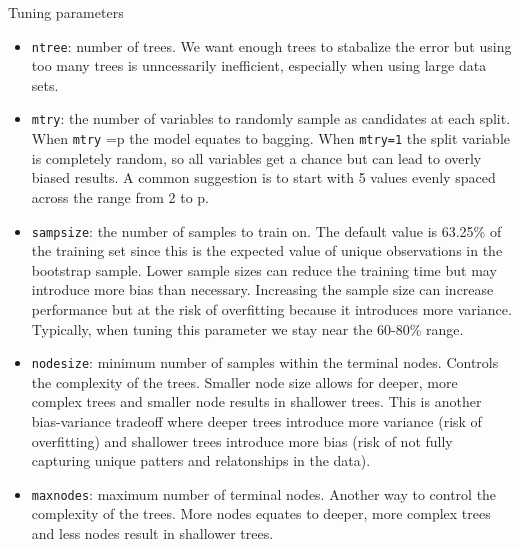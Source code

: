 \documentclass[10pt,ignorenonframetext,]{beamer}
\providecommand{\tightlist}{%
  \setlength{\itemsep}{0pt}\setlength{\parskip}{0pt}}
\begin{document}
\begin{frame}[fragile]{Tuning parameters}

\begin{itemize}
\tightlist
\item
  \texttt{ntree}: number of trees. We want enough trees to stabalize the
  error but using too many trees is unncessarily inefficient, especially
  when using large data sets.
\item
  \texttt{mtry}: the number of variables to randomly sample as
  candidates at each split. When \texttt{mtry} =p the model equates to
  bagging. When \texttt{mtry=1} the split variable is completely random,
  so all variables get a chance but can lead to overly biased results. A
  common suggestion is to start with 5 values evenly spaced across the
  range from 2 to p.
\item
  \texttt{sampsize}: the number of samples to train on. The default
  value is 63.25\% of the training set since this is the expected value
  of unique observations in the bootstrap sample. Lower sample sizes can
  reduce the training time but may introduce more bias than necessary.
  Increasing the sample size can increase performance but at the risk of
  overfitting because it introduces more variance. Typically, when
  tuning this parameter we stay near the 60-80\% range.
\item
  \texttt{nodesize}: minimum number of samples within the terminal
  nodes. Controls the complexity of the trees. Smaller node size allows
  for deeper, more complex trees and smaller node results in shallower
  trees. This is another bias-variance tradeoff where deeper trees
  introduce more variance (risk of overfitting) and shallower trees
  introduce more bias (risk of not fully capturing unique patters and
  relatonships in the data).
\item
  \texttt{maxnodes}: maximum number of terminal nodes. Another way to
  control the complexity of the trees. More nodes equates to deeper,
  more complex trees and less nodes result in shallower trees.
\end{itemize}

\end{frame}
\end{document}
